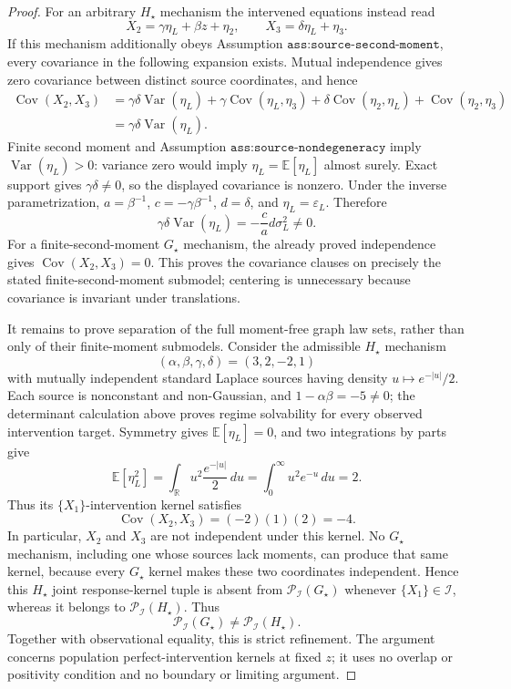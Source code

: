 \documentclass{article}
\begin{document}
\begin{proof}
For an arbitrary \(H_\star\) mechanism the intervened equations instead read
\[
 X_2=\gamma\eta_L+\beta z+\eta_2,
 \qquad
 X_3=\delta\eta_L+\eta_3.
\]
If this mechanism additionally obeys Assumption \(\texttt{ass:source-second-moment}\), every covariance in the following expansion exists. Mutual independence gives zero covariance between distinct source coordinates, and hence
\[
 \begin{aligned}
 \operatorname{Cov}(X_2,X_3)
 &=\gamma\delta\operatorname{Var}(\eta_L)
   +\gamma\operatorname{Cov}(\eta_L,\eta_3)
   +\delta\operatorname{Cov}(\eta_2,\eta_L)
   +\operatorname{Cov}(\eta_2,\eta_3)\\
 &=\gamma\delta\operatorname{Var}(\eta_L).
 \end{aligned}
\]
Finite second moment and Assumption \(\texttt{ass:source-nondegeneracy}\) imply \(\operatorname{Var}(\eta_L)>0\): variance zero would imply \(\eta_L=\mathbb E[\eta_L]\) almost surely. Exact support gives \(\gamma\delta\ne0\), so the displayed covariance is nonzero. Under the inverse parametrization, \(a=\beta^{-1}\), \(c=-\gamma\beta^{-1}\), \(d=\delta\), and \(\eta_L=\varepsilon_L\). Therefore
\[
 \gamma\delta\operatorname{Var}(\eta_L)
 =-\frac ca d\sigma_L^2\ne0.
\]
For a finite-second-moment \(G_\star\) mechanism, the already proved independence gives \(\operatorname{Cov}(X_2,X_3)=0\). This proves the covariance clauses on precisely the stated finite-second-moment submodel; centering is unnecessary because covariance is invariant under translations.

It remains to prove separation of the full moment-free graph law sets, rather than only of their finite-moment submodels. Consider the admissible \(H_\star\) mechanism
\[
 (\alpha,\beta,\gamma,\delta)=(3,2,-2,1)
\]
with mutually independent standard Laplace sources having density \(u\mapsto e^{-|u|}/2\). Each source is nonconstant and non-Gaussian, and \(1-\alpha\beta=-5\ne0\); the determinant calculation above proves regime solvability for every observed intervention target. Symmetry gives \(\mathbb E[\eta_L]=0\), and two integrations by parts give
\[
 \mathbb E[\eta_L^2]
 =\int_{\mathbb R}u^2\frac{e^{-|u|}}2\,du
 =\int_0^\infty u^2e^{-u}\,du
 =2.
\]
Thus its \(\{X_1\}\)-intervention kernel satisfies
\[
 \operatorname{Cov}(X_2,X_3)
 =(-2)(1)(2)=-4.
\]
In particular, \(X_2\) and \(X_3\) are not independent under this kernel. No \(G_\star\) mechanism, including one whose sources lack moments, can produce that same kernel, because every \(G_\star\) kernel makes these two coordinates independent. Hence this \(H_\star\) joint response-kernel tuple is absent from \(\mathcal P_{\mathcal I}(G_\star)\) whenever \(\{X_1\}\in\mathcal I\), whereas it belongs to \(\mathcal P_{\mathcal I}(H_\star)\). Thus
\[
 \mathcal P_{\mathcal I}(G_\star)
 \ne
 \mathcal P_{\mathcal I}(H_\star).
\]
Together with observational equality, this is strict refinement. The argument concerns population perfect-intervention kernels at fixed \(z\); it uses no overlap or positivity condition and no boundary or limiting argument.
\end{proof}
\end{document}
